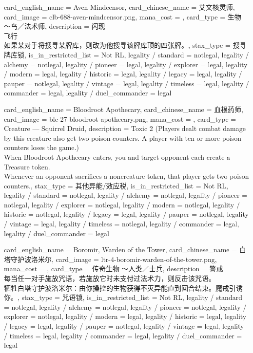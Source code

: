 \documentclass[lang = cn, color = black, 10pt]{AllThatStax}
\begin{document}
\card
{
	card_english_name = {Aven Mindcensor},
	card_chinese_name = {艾文核灵师},
	card_image = clb-688-aven-mindcensor.png,
	mana_cost = ,
	card_type = 生物 ～鸟／法术师,
	description = {闪现\\
		飞行\\
		如果某对手将搜寻某牌库，则改为他搜寻该牌库顶的四张牌。},
	stax_type = 搜寻牌库锁,
	is_in_restricted_list = Not RL,
	legality / standard = notlegal,
	legality / alchemy = notlegal,
	legality / pioneer = legal,
	legality / explorer = legal,
	legality / modern = legal,
	legality / historic = legal,
	legality / legacy = legal,
	legality / pauper = notlegal,
	legality / vintage = legal,
	legality / timeless = legal,
	legality / commander = legal,
	legality / duel_commander = legal
}

\card
{
	card_english_name = {Bloodroot Apothecary},
	card_chinese_name = {血根药师},
	card_image = blc-27-bloodroot-apothecary.png,
	mana_cost = ,
	card_type = Creature — Squirrel Druid,
	description = {Toxic 2 (Players dealt combat damage by this creature also get two poison counters. A player with ten or more poison counters loses the game.)\\
		When Bloodroot Apothecary enters, you and target opponent each create a Treasure token.\\
		Whenever an opponent sacrifices a noncreature token, that player gets two poison counters.},
	stax_type = 其他异能/效应税,
	is_in_restricted_list = Not RL,
	legality / standard = notlegal,
	legality / alchemy = notlegal,
	legality / pioneer = notlegal,
	legality / explorer = notlegal,
	legality / modern = notlegal,
	legality / historic = notlegal,
	legality / legacy = legal,
	legality / pauper = notlegal,
	legality / vintage = legal,
	legality / timeless = notlegal,
	legality / commander = legal,
	legality / duel_commander = legal
}

\card
{
	card_english_name = {Boromir, Warden of the Tower},
	card_chinese_name = {白塔守护波洛米尔},
	card_image = ltr-4-boromir-warden-of-the-tower.png,
	mana_cost = ,
	card_type = 传奇生物 ～人类／士兵,
	description = {警戒\\
		每当任一对手施放咒语，若施放它时未支付过法术力，则反击该咒语。\\
		牺牲白塔守护波洛米尔：由你操控的生物获得不灭异能直到回合结束。魔戒引诱你。},
	stax_type = 咒语锁,
	is_in_restricted_list = Not RL,
	legality / standard = notlegal,
	legality / alchemy = notlegal,
	legality / pioneer = notlegal,
	legality / explorer = notlegal,
	legality / modern = legal,
	legality / historic = legal,
	legality / legacy = legal,
	legality / pauper = notlegal,
	legality / vintage = legal,
	legality / timeless = legal,
	legality / commander = legal,
	legality / duel_commander = legal
}
\end{document}
